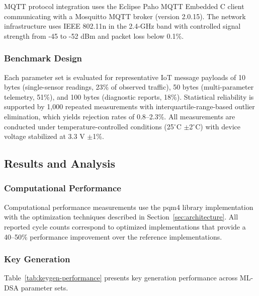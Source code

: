 \documentclass[final, twoside]{IEEEtran} %
\begin{document}
MQTT protocol integration uses the Eclipse Paho MQTT Embedded C client communicating with a Mosquitto MQTT broker (version 2.0.15). The network infrastructure uses IEEE 802.11n in the 2.4-GHz band with controlled signal strength from -45 to -52 dBm and packet loss below 0.1\%.

\subsubsection{Benchmark Design}

Each parameter set is evaluated for representative IoT message payloads of 10 bytes (single-sensor readings, 23\% of observed traffic), 50 bytes (multi-parameter telemetry, 51\%), and 100 bytes (diagnostic reports, 18\%). Statistical reliability is supported by 1,000 repeated measurements with interquartile-range-based outlier elimination, which yields rejection rates of 0.8--2.3\%. All measurements are conducted under temperature-controlled conditions (25$^\circ$C $\pm$2$^\circ$C) with device voltage stabilized at 3.3 V $\pm$1\%.

\subsection{Results and Analysis}\label{sec:results}

\subsubsection{Computational Performance}

Computational performance measurements use the pqm4 library implementation with the optimization techniques described in Section~\ref{sec:architecture}. All reported cycle counts correspond to optimized implementations that provide a 40--50\% performance improvement over the reference implementations.

\subsubsection{Key Generation}

Table~\ref{tab:keygen-performance} presents key generation performance across ML-DSA parameter sets.
\end{document}
